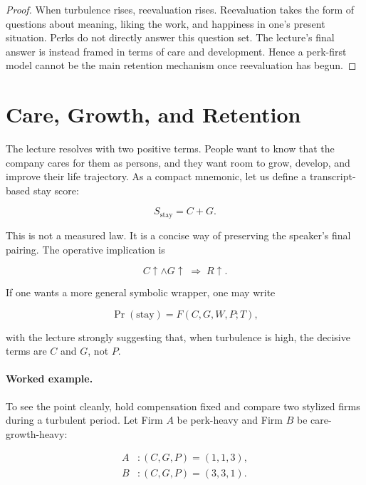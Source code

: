 \begin{proof}
When turbulence rises, reevaluation rises. Reevaluation takes the form of questions about meaning, liking the work, and happiness in one's present situation. Perks do not directly answer this question set. The lecture's final answer is instead framed in terms of care and development. Hence a perk-first model cannot be the main retention mechanism once reevaluation has begun.
\end{proof}

\section{Care, Growth, and Retention}

The lecture resolves with two positive terms. People want to know that the company cares for them as persons, and they want room to grow, develop, and improve their life trajectory. As a compact mnemonic, let us define a transcript-based stay score:

\begin{equation}
S_{\text{stay}} = C + G .
\end{equation}

This is not a measured law. It is a concise way of preserving the speaker's final pairing. The operative implication is

\begin{equation}
C \uparrow \land G \uparrow \;\Rightarrow\; R \uparrow .
\end{equation}

If one wants a more general symbolic wrapper, one may write

\begin{equation}
\Pr(\text{stay}) = F(C,G,W,P;T),
\end{equation}

with the lecture strongly suggesting that, when turbulence is high, the decisive terms are \(C\) and \(G\), not \(P\).

\paragraph{Worked example.} To see the point cleanly, hold compensation fixed and compare two stylized firms during a turbulent period. Let Firm \(A\) be perk-heavy and Firm \(B\) be care-growth-heavy:

\begin{align}
A &: (C,G,P) = (1,1,3),\\
B &: (C,G,P) = (3,3,1).
\end{align}

